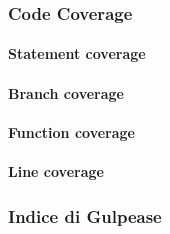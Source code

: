 \subsubsection{Code Coverage}
\paragraph{Statement coverage}
\paragraph{Branch coverage}
\paragraph{Function coverage}
\paragraph{Line coverage}


\pagebreak
\subsubsection{Indice di Gulpease}

